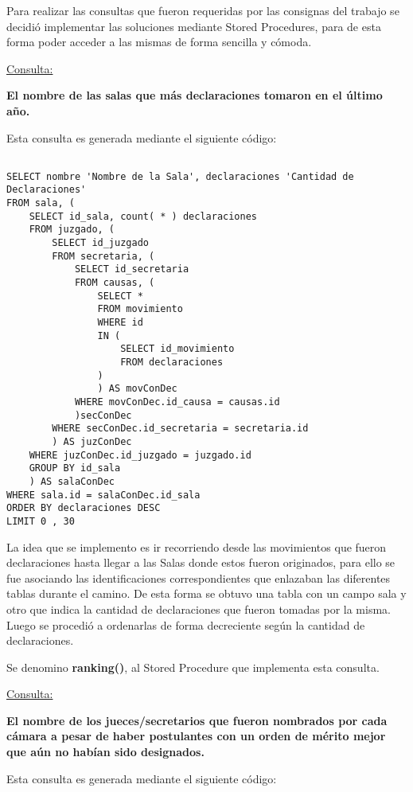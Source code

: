 Para realizar las consultas que fueron requeridas por las consignas del trabajo se decidió implementar las soluciones mediante Stored Procedures, para de esta forma poder acceder a las mismas de forma sencilla y cómoda.

\underline{Consulta:}

\textbf{El nombre de las salas que más declaraciones tomaron en el último año.}

Esta consulta es generada mediante el siguiente código:

\begin{verbatim}

SELECT nombre 'Nombre de la Sala', declaraciones 'Cantidad de Declaraciones'
FROM sala, (
	SELECT id_sala, count( * ) declaraciones
	FROM juzgado, (
		SELECT id_juzgado
		FROM secretaria, (
			SELECT id_secretaria
			FROM causas, (
				SELECT *
				FROM movimiento
				WHERE id
				IN (
					SELECT id_movimiento
					FROM declaraciones
				)
				) AS movConDec
			WHERE movConDec.id_causa = causas.id
			)secConDec
		WHERE secConDec.id_secretaria = secretaria.id
		) AS juzConDec
	WHERE juzConDec.id_juzgado = juzgado.id
	GROUP BY id_sala
	) AS salaConDec
WHERE sala.id = salaConDec.id_sala
ORDER BY declaraciones DESC
LIMIT 0 , 30

\end{verbatim}

La idea que se implemento es ir recorriendo desde las movimientos que fueron declaraciones hasta llegar a las Salas donde estos fueron originados, para ello se fue asociando las identificaciones correspondientes que enlazaban las diferentes tablas durante el camino. De esta forma se obtuvo una tabla con un campo sala y otro que indica la cantidad de declaraciones que fueron tomadas por la misma. Luego se procedió a ordenarlas de forma decreciente según la cantidad de declaraciones.

Se denomino \textbf{ranking()}, al Stored Procedure que implementa esta consulta.

\underline{Consulta:}

\textbf{El nombre de los jueces/secretarios que fueron nombrados por cada cámara a pesar de haber postulantes con un orden de mérito mejor que aún no habían sido designados.}

Esta consulta es generada mediante el siguiente código:

